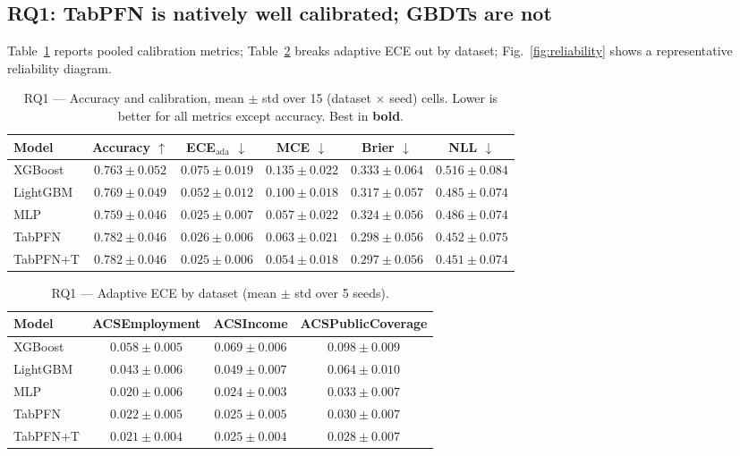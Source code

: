 \documentclass[review,12pt]{elsarticle}
\begin{document}
\subsection{RQ1: TabPFN is natively well calibrated; GBDTs are not}
\label{sec:rq1}

Table~\ref{tab:rq1} reports pooled calibration metrics; Table~\ref{tab:rq1ds} breaks adaptive ECE out by dataset; Fig.~\ref{fig:reliability} shows a representative reliability diagram.

\begin{table}[t]
\centering
\caption{RQ1 --- Accuracy and calibration, mean $\pm$ std over 15 (dataset $\times$ seed) cells. Lower is better for all metrics except accuracy. Best in \textbf{bold}.}
\label{tab:rq1}
\small
\begin{tabular}{lccccc}
\toprule
Model & Accuracy $\uparrow$ & ECE$_{\mathrm{ada}}$ $\downarrow$ & MCE $\downarrow$ & Brier $\downarrow$ & NLL $\downarrow$ \\
\midrule
XGBoost      & $0.763 \pm 0.052$ & $0.075 \pm 0.019$ & $0.135 \pm 0.022$ & $0.333 \pm 0.064$ & $0.516 \pm 0.084$ \\
LightGBM     & $0.769 \pm 0.049$ & $0.052 \pm 0.012$ & $0.100 \pm 0.018$ & $0.317 \pm 0.057$ & $0.485 \pm 0.074$ \\
MLP          & $0.759 \pm 0.046$ & $0.025 \pm 0.007$ & $0.057 \pm 0.022$ & $0.324 \pm 0.056$ & $0.486 \pm 0.074$ \\
TabPFN       & $\mathbf{0.782 \pm 0.046}$ & $0.026 \pm 0.006$ & $0.063 \pm 0.021$ & $0.298 \pm 0.056$ & $0.452 \pm 0.075$ \\
TabPFN+T     & $\mathbf{0.782 \pm 0.046}$ & $\mathbf{0.025 \pm 0.006}$ & $\mathbf{0.054 \pm 0.018}$ & $\mathbf{0.297 \pm 0.056}$ & $\mathbf{0.451 \pm 0.074}$ \\
\bottomrule
\end{tabular}
\end{table}

\begin{table}[t]
\centering
\caption{RQ1 --- Adaptive ECE by dataset (mean $\pm$ std over 5 seeds).}
\label{tab:rq1ds}
\small
\begin{tabular}{lccc}
\toprule
Model & ACSEmployment & ACSIncome & ACSPublicCoverage \\
\midrule
XGBoost   & $0.058 \pm 0.005$ & $0.069 \pm 0.006$ & $0.098 \pm 0.009$ \\
LightGBM  & $0.043 \pm 0.006$ & $0.049 \pm 0.007$ & $0.064 \pm 0.010$ \\
MLP       & $\mathbf{0.020 \pm 0.006}$ & $\mathbf{0.024 \pm 0.003}$ & $0.033 \pm 0.007$ \\
TabPFN    & $0.022 \pm 0.005$ & $0.025 \pm 0.005$ & $0.030 \pm 0.007$ \\
TabPFN+T  & $0.021 \pm 0.004$ & $0.025 \pm 0.004$ & $\mathbf{0.028 \pm 0.007}$ \\
\bottomrule
\end{tabular}
\end{table}
\end{document}
